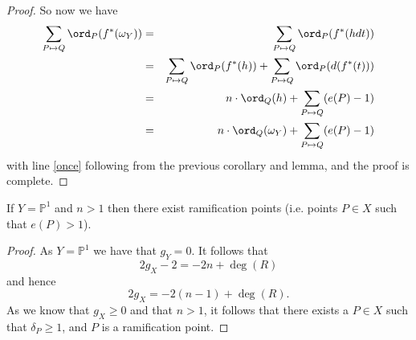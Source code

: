 \begin{proof}
	So now we have
		\begin{eqnarray}\label{once}
			\sum_{P\mapsto Q}\ord_{P}(f^*(\omega_{Y})) & = & \sum_{P\mapsto Q}\ord_{P}(f^*(hdt)) \nonumber \\
			& = & \sum_{P\mapsto Q} \ord_{P}(f^*(h)) + \sum_{P\mapsto Q} \ord_{P}(d(f^*(t))) \nonumber \\
			& = & n\cdot \ord_{Q}(h) + \sum_{P\mapsto Q} (e(P)-1) \\
		      & = & n\cdot \ord_{Q}(\omega_{Y}) + \sum_{P\mapsto Q} (e(P)-1) \nonumber
		\end{eqnarray}
	with line \eqref{once} following from the previous corollary and lemma, and the proof is complete.
\end{proof}



\begin{cor}
	If $Y=\mathbb{P}^{1}$ and $n>1$ then there exist ramification points (i.e. points  $P\in X$ such that $e(P)>1$).
\end{cor}
\begin{proof}
	As $Y=\mathbb{P}^{1}$ we have that $g_{Y}=0$.
	It follows that 
		\begin{equation*}
			2g_{X}-2=-2n+\deg(R)
		\end{equation*}
	 and hence
		\begin{equation*}
			2g_{X}=-2(n-1)+\deg(R).
		\end{equation*}
	As we know that $g_{X}\geq 0$ and that $n>1$, it follows that there exists a $P\in X$ such that $\delta_P\geq 1$, and $P$ is a ramification point.
\end{proof}


\newpage
